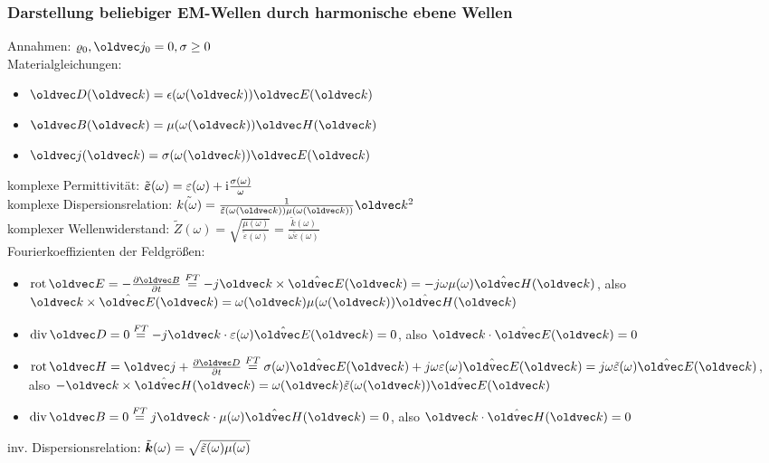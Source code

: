 \documentclass[6pt,a4paper]{scrartcl}
\let\vec\oldvec
\begin{document}
\begin{multicols}{4}
	\subsubsection{Darstellung beliebiger EM-Wellen durch harmonische ebene Wellen}
	Annahmen: $\varrho_0, \vec j_0 = 0, \sigma \geq 0$\\
	Materialgleichungen:
	\begin{itemize}
		\item $\vec D(\vec k) = \epsilon(\omega(\vec k))\vec E(\vec k)$
		\item $\vec B(\vec k) = \mu(\omega(\vec k))\vec H(\vec k)$
		\item $\vec j(\vec k) = \sigma(\omega(\vec k))\vec E(\vec k)$
	\end{itemize}
	komplexe Permittivität: $\tilde{\boldsymbol{\varepsilon}}(\omega) = \varepsilon(\omega) + \mathrm{i} \frac{\sigma(\omega)}{\omega}$\\
	komplexe Dispersionsrelation: $\tilde{k(\omega)}=\frac{1}{\tilde{\varepsilon}(\omega(\vec k))\mu(\omega(\vec k))}\vec k^2$\\
	komplexer Wellenwiderstand: $\tilde{Z}(\omega) = \sqrt{\frac{\mu(\omega)}{\tilde{\varepsilon}(\omega)}} = \frac{\tilde{k}(\omega)}{\omega\tilde{\varepsilon}(\omega)}$\\
	Fourierkoeffizienten der Feldgrößen:
	\begin{itemize}
		\item $\rot\vec E = -\frac{\partial\vec B}{\partial t} \overset{FT}{=} -j\vec k \times\hat{\vec E}(\vec k) = -j\omega\mu(\omega)\hat{\vec H}(\vec k)$, also $\vec k\times\hat{\vec E}(\vec k) = \omega(\vec k)\mu(\omega(\vec k))\hat{\vec H}(\vec k)$
		\item $\div\vec D = 0 \overset{FT}{=} -j\vec k\cdot\varepsilon(\omega)\hat{\vec E}(\vec k) = 0$, also $\vec k\cdot\hat{\vec E}(\vec k) = 0$
		\item $\rot\vec H = \vec j + \frac{\partial\vec D}{\partial t} \overset{FT}{=} \sigma(\omega)\hat{\vec E}(\vec k)+j\omega\varepsilon(\omega)\hat{\vec E}(\vec k) = j\omega\tilde{\varepsilon}(\omega)\hat{\vec E}(\vec k)$, also $-\vec k\times\hat{\vec H}(\vec k) = \omega(\vec k)\tilde{\varepsilon}(\omega(\vec k))\hat{\vec E}(\vec k)$
		\item $\div\vec B = 0 \overset{FT}{=} j\vec k\cdot\mu(\omega)\hat{\vec H}(\vec k) = 0$, also $\vec k\cdot\hat{\vec H}(\vec k) = 0$
	\end{itemize}
	inv. Dispersionsrelation: $\tilde{\boldsymbol{k}}(\omega) = \sqrt{\tilde{\varepsilon}(\omega)\mu(\omega)}$\\

\end{multicols}
\end{document}

